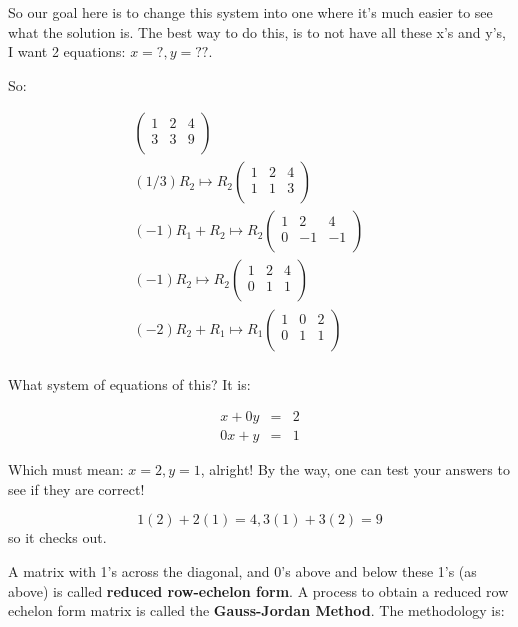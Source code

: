 So our goal here is to change this system into one where it's much easier to see what the solution is.  The best way to do this, is to not have all these x's and y's, I want 2 equations: $x=?, y=??$.

So:

\begin{eqnarray*}
\left( \begin{array}{rr|r}
1 & 2 & 4\\
3 & 3  & 9\\
\end{array}\right)&&\\
(1/3)R_2\mapsto R_2 \left( \begin{array}{rr|r}
1 & 2 & 4\\
1 & 1  & 3\\
\end{array}\right)&&\\
(-1)R_1+R_2\mapsto R_2 \left( \begin{array}{rr|r}
1 & 2 & 4\\
0 & -1  & -1\\
\end{array}\right)&&\\
(-1)R_2\mapsto R_2 \left( \begin{array}{rr|r}
1 & 2 & 4\\
0 & 1  & 1\\
\end{array}\right)&&\\
(-2)R_2+R_1\mapsto R_1 \left( \begin{array}{rr|r}
1 & 0 & 2\\
0 & 1  & 1\\
\end{array}\right)&&\\
\end{eqnarray*}





What system of equations of this?  It is:

\begin{eqnarray*}
x+0y&=&2\\
0x+y&=&1
\end{eqnarray*}

Which must mean: $x=2, y=1$, alright!  By the way, one can test your answers to see if they are correct!

$$1(2)+2(1)=4, 3(1)+3(2)=9$$ so it checks out.

A matrix with 1's across the diagonal, and 0's above and below these 1's (as above) is called \textbf{reduced row-echelon form}.  A process to obtain a reduced row echelon form matrix  is called the \textbf{Gauss-Jordan Method}.  The methodology is:

